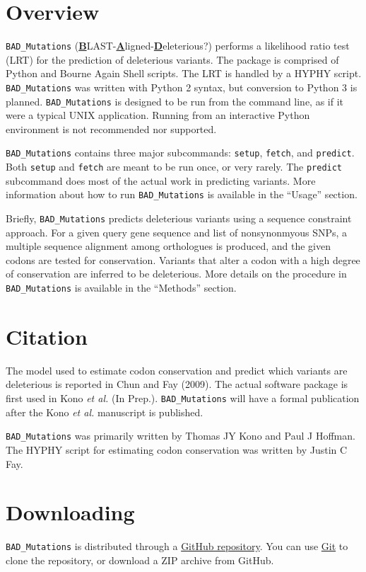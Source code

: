 \documentclass[12pt]{article}
\newcommand{\BM}{\texttt{BAD\_Mutations} }
\begin{document}
\section*{Overview}
\par \BM (\textbf{\underline{B}}LAST-\textbf{\underline{A}}ligned-\textbf{\underline{D}}eleterious?)
performs a likelihood ratio test (LRT) for the prediction of deleterious
variants. The package is comprised of Python and Bourne Again Shell scripts.
The LRT is handled by a HYPHY script. \BM was written with Python 2 syntax, but
conversion to Python 3 is planned. \BM is designed to be run from the command
line, as if it were a typical UNIX application. Running from an interactive
Python environment is not recommended nor supported.

\par \BM contains three major subcommands: \texttt{setup}, \texttt{fetch}, and
\texttt{predict}. Both \texttt{setup} and \texttt{fetch} are meant to be run
once, or very rarely. The \texttt{predict} subcommand does most of the actual
work in predicting variants. More information about how to run \BM is available
in the ``Usage'' section.

\par Briefly, \BM predicts deleterious variants using a sequence constraint
approach. For a given query gene sequence and list of nonsynonmyous SNPs, a
multiple sequence alignment among orthologues is produced, and the given codons
are tested for conservation. Variants that alter a codon with a high degree of
conservation are inferred to be deleterious. More details on the procedure in
\BM is available in the ``Methods'' section.

\section*{Citation}
\par The model used to estimate codon conservation and predict which variants
are deleterious is reported in Chun and Fay (2009). The actual software package
is first used in Kono \textit{et al.} (In Prep.). \BM will have a formal
publication after the Kono \textit{et al.} manuscript is published.

\par \BM was primarily written by Thomas JY Kono and Paul J Hoffman. The HYPHY
script for estimating codon conservation was written by Justin C Fay.

\section*{Downloading}
\par \BM is distributed through a
\href{https://github.com/MorrellLAB/BAD_Mutations}{GitHub repository}. You can
use \href{https://git-scm.com/}{Git} to clone the repository, or download a ZIP
archive from GitHub.
\end{document}
